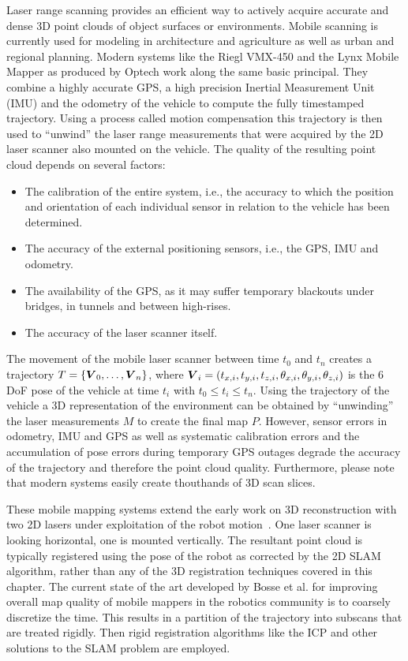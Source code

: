 \documentclass[twocolumn,oneside]{book}
\newcommand{\V}[1]{\vector{#1}}  %
\begin{document}
Laser range scanning provides an efficient way to actively acquire
accurate and dense 3D point clouds of object surfaces or
environments. Mobile scanning is currently used for modeling in
architecture and agriculture as well as urban and regional planning.
Modern systems like the Riegl VMX-450 and the Lynx Mobile Mapper as
produced by Optech work along the same basic principal. They combine a
highly accurate GPS, a high precision Inertial Measurement Unit (IMU)
and the odometry of the vehicle to compute the fully timestamped
trajectory.  Using a process called motion compensation this
trajectory is then used to ``unwind'' the laser range measurements
that were acquired by the 2D laser scanner also mounted on the
vehicle.  The quality of the resulting point cloud depends on several
factors:
\begin{itemize}
  \item The calibration of the entire system, i.e., the accuracy to
    which the position and orientation of each individual sensor in
    relation to the vehicle has been determined.
  \item The accuracy of the external positioning sensors, i.e., the
    GPS, IMU and odometry.
  \item The availability of the GPS, as it may suffer temporary
    blackouts under bridges, in tunnels and between high-rises.
  \item The accuracy of the laser scanner itself.
\end{itemize}
The movement of the mobile laser scanner between time $t_0$ and $t_n$
creates a trajectory $T = \{ \V V_0, \dots, \V V_n\}$, where $\V V_i=
(t_{x,i}, t_{y,i}, t_{z,i}, \theta_{x,i}, \theta_{y,i}, \theta_{z,i})$
is the 6 DoF pose of the vehicle at time $t_i$ with $t_0 \leq t_i \leq
t_n$.  Using the trajectory of the vehicle a 3D representation of the
environment can be obtained by ``unwinding'' the laser measurements
$M$ to create the final map $P$. However, sensor errors in odometry,
IMU and GPS as well as systematic calibration errors and the
accumulation of pose errors during temporary GPS outages degrade the
accuracy of the trajectory and therefore the point cloud
quality. Furthermore, please note that modern systems easily create
thouthands of 3D scan slices.

These mobile mapping systems extend the early work on 3D
reconstruction with two 2D lasers under exploitation of the robot
motion~\cite{thrun00}. One laser scanner is looking horizontal, one is
mounted vertically. The resultant point cloud is typically registered
using the pose of the robot as corrected by the 2D SLAM algorithm,
rather than any of the 3D registration techniques covered in this
chapter. The current state of the art developed by Bosse et
al. \cite{Bosse:2012} for improving overall map quality of mobile
mappers in the robotics community is to coarsely discretize the
time. This results in a partition of the trajectory into subscans that
are treated rigidly. Then rigid registration algorithms like the ICP
and other solutions to the SLAM problem are employed.
\end{document}
